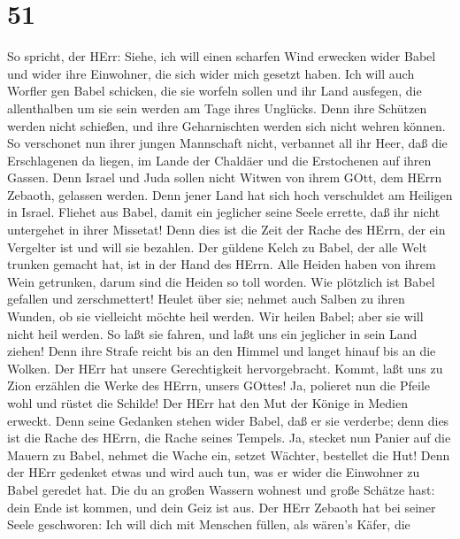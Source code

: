 \hypertarget{section-50}{%
\section{51}\label{section-50}}

 So spricht, der HErr: Siehe, ich will einen scharfen Wind
erwecken wider Babel und wider ihre Einwohner, die sich wider mich
gesetzt haben.  Ich will auch Worfler gen Babel schicken,
die sie worfeln sollen und ihr Land ausfegen, die allenthalben um sie
sein werden am Tage ihres Unglücks.  Denn ihre Schützen
werden nicht schießen, und ihre Geharnischten werden sich nicht wehren
können. So verschonet nun ihrer jungen Mannschaft nicht, verbannet all
ihr Heer,  daß die Erschlagenen da liegen, im Lande der
Chaldäer und die Erstochenen auf ihren Gassen.  Denn Israel
und Juda sollen nicht Witwen von ihrem GOtt, dem HErrn Zebaoth, gelassen
werden. Denn jener Land hat sich hoch verschuldet am Heiligen in Israel.
 Fliehet aus Babel, damit ein jeglicher seine Seele errette,
daß ihr nicht untergehet in ihrer Missetat! Denn dies ist die Zeit der
Rache des HErrn, der ein Vergelter ist und will sie bezahlen.
 Der güldene Kelch zu Babel, der alle Welt trunken gemacht
hat, ist in der Hand des HErrn. Alle Heiden haben von ihrem Wein
getrunken, darum sind die Heiden so toll worden.  Wie
plötzlich ist Babel gefallen und zerschmettert! Heulet über sie; nehmet
auch Salben zu ihren Wunden, ob sie vielleicht möchte heil werden.
 Wir heilen Babel; aber sie will nicht heil werden. So laßt
sie fahren, und laßt uns ein jeglicher in sein Land ziehen! Denn ihre
Strafe reicht bis an den Himmel und langet hinauf bis an die Wolken.
 Der HErr hat unsere Gerechtigkeit hervorgebracht. Kommt,
laßt uns zu Zion erzählen die Werke des HErrn, unsers GOttes!
 Ja, polieret nun die Pfeile wohl und rüstet die Schilde!
Der HErr hat den Mut der Könige in Medien erweckt. Denn seine Gedanken
stehen wider Babel, daß er sie verderbe; denn dies ist die Rache des
HErrn, die Rache seines Tempels.  Ja, stecket nun Panier
auf die Mauern zu Babel, nehmet die Wache ein, setzet Wächter, bestellet
die Hut! Denn der HErr gedenket etwas und wird auch tun, was er wider
die Einwohner zu Babel geredet hat.  Die du an großen
Wassern wohnest und große Schätze hast: dein Ende ist kommen, und dein
Geiz ist aus.  Der HErr Zebaoth hat bei seiner Seele
geschworen: Ich will dich mit Menschen füllen, als wären's Käfer, die
